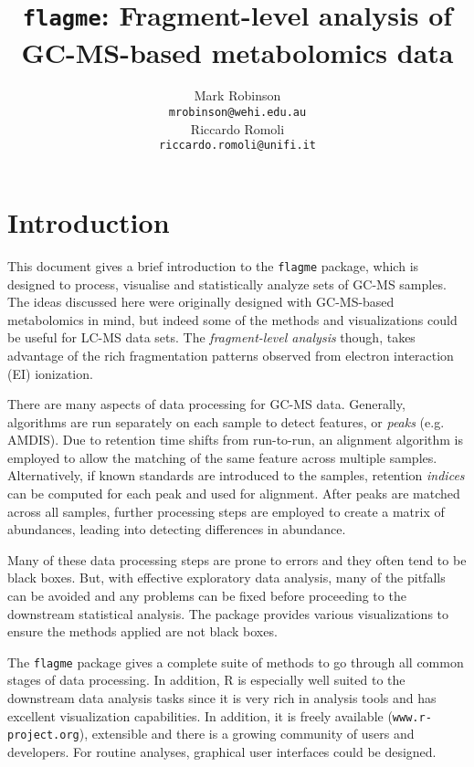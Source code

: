 \documentclass{article}\usepackage[]{graphicx}\usepackage[]{color}
\begin{document}

\title{\texttt{flagme}: Fragment-level analysis of \\ GC-MS-based 
  metabolomics data}
\author{Mark Robinson \\ \texttt{mrobinson@wehi.edu.au} \\ Riccardo  
  Romoli \\ \texttt{riccardo.romoli@unifi.it}} 
\maketitle


\section{Introduction}
\noindent This document gives a brief introduction to the
\texttt{flagme} package, which is designed to process, visualise and
statistically analyze sets of GC-MS samples. The ideas discussed here
were originally designed with GC-MS-based metabolomics in mind, but
indeed some of the methods and visualizations could be useful for
LC-MS data sets. The {\em fragment-level analysis} though, takes
advantage of the rich fragmentation patterns observed from electron
interaction (EI) ionization. 

There are many aspects of data processing for GC-MS data. Generally,
algorithms are run separately on each sample to detect features, or
{\em peaks} (e.g. AMDIS). Due to retention time shifts from
run-to-run, an alignment algorithm is employed to allow the matching
of the same feature across multiple samples.  Alternatively, if known
standards are introduced to the samples, retention {\em indices} can
be computed for each peak and used for alignment. After peaks are
matched across all samples, further processing steps are employed to
create a matrix of abundances, leading into detecting differences in
abundance. 

Many of these data processing steps are prone to errors and they often
tend to be black boxes. But, with effective exploratory data
analysis, many of the pitfalls can be avoided and any problems can be
fixed before proceeding to the downstream statistical analysis. The
package provides various visualizations to ensure the methods applied
are not black boxes. 

The \texttt{flagme} package gives a complete suite of methods to go
through all common stages of data processing. In addition, R is
especially well suited to the downstream data analysis tasks since it
is very rich in analysis tools and has excellent visualization
capabilities. In addition, it is freely available
(\texttt{www.r-project.org}), extensible and there is a growing
community of users and developers. For routine analyses, graphical
user interfaces could be designed. 
\end{document}
